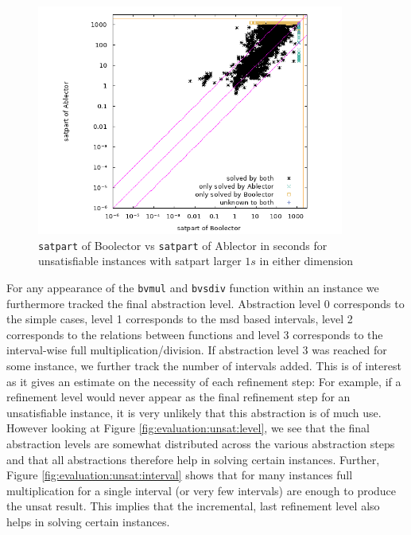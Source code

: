 \begin{figure}[]
    \centering
        \includegraphics[width=0.9\textwidth]{plots/unsat/Boolector-vs-Ablector-satpart-big.png}
    \caption{\texttt{satpart} of Boolector vs \texttt{satpart} of Ablector in seconds for unsatisfiable instances with satpart larger $1s$ in either dimension}
    \label{fig:evaluation:unsat:scatter-big}
\end{figure}
For any appearance of the \texttt{bvmul} and \texttt{bvsdiv} function within an instance we furthermore tracked the final abstraction level. Abstraction level 0 corresponds to the simple cases, level 1 corresponds to the msd based intervals, level 2 corresponds to the relations between functions and level 3 corresponds to the interval-wise full multiplication/division. If abstraction level 3 was reached for some instance, we further track the number of intervals added. This is of interest as it gives an estimate on the necessity of each refinement step: For example, if a refinement level would never appear as the final refinement step for an unsatisfiable instance, it is very unlikely that this abstraction is of much use. However looking at Figure \ref{fig:evaluation:unsat:level}, we see that the final abstraction levels are somewhat distributed across the various abstraction steps and that all abstractions therefore help in solving certain instances.
Further, Figure \ref{fig:evaluation:unsat:interval} shows that for many instances full multiplication for a single interval (or very few intervals) are enough to produce the unsat result. This implies that the incremental, last refinement level also helps in solving certain instances.

